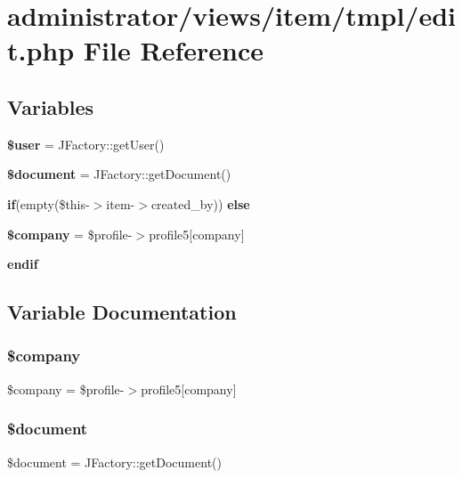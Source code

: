 \section{administrator/views/item/tmpl/edit.php File Reference}
\label{administrator_2views_2item_2tmpl_2edit_8php}
\subsection*{Variables}
\begin{DoxyCompactItemize}
\item 
\textbf{ \$user} = J\+Factory\+::get\+User()
\item 
\textbf{ \$document} = J\+Factory\+::get\+Document()
\item 
\textbf{ if}(empty(\$this-\/$>$item-\/$>$created\+\_\+by)) \textbf{ else}
\item 
\textbf{ \$company} = \$profile-\/$>$profile5[\textquotesingle{}company\textquotesingle{}]
\item 
\textbf{ endif}
\end{DoxyCompactItemize}


\subsection{Variable Documentation}
\mbox{\label{administrator_2views_2item_2tmpl_2edit_8php_a3306bb3d7f99fc57bee9e96f928769d4}} 
\subsubsection{\$company}
{\footnotesize\ttfamily \$company = \$profile-\/$>$profile5[\textquotesingle{}company\textquotesingle{}]}

\mbox{\label{administrator_2views_2item_2tmpl_2edit_8php_ac5a31edb787609a3143dec9bfa8063ea}} 
\subsubsection{\$document}
{\footnotesize\ttfamily \$document = J\+Factory\+::get\+Document()}

